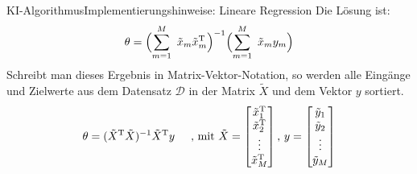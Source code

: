 \documentclass[169, handout	]{THIbeamer} %
\begin{document}
	\begin{frame}{KI-Algorithmus}{Implementierungshinweise: Lineare Regression}
		Die Lösung ist:
		\begin{equation}
				\theta = \Bigl( \sum_{m=1}^M\ \tilde{x}_m \tilde{x}_m^{\text{T}} \Bigr)^{-1} \Bigl( \sum_{m=1}^M\ \tilde{x}_m y_m \Bigr)
		\end{equation}
		Schreibt man dieses Ergebnis in Matrix-Vektor-Notation, so werden alle Eingänge und Zielwerte aus dem Datensatz $\mathcal{D}$ in der Matrix $\tilde{X}$ und dem Vektor $y$ sortiert. 
		\begin{equation}
			\theta = ( \tilde{X}^{\text{T}} \tilde{X} )^{-1} \tilde{X}^{\text{T}} y
			\hspace{0.5 cm}	
			\text{, mit }			
			\tilde{X} = 
			\begin{bmatrix}
				\tilde{x}_1^{\text{T}} \\
				\tilde{x}_2^{\text{T}} \\	
				\vdots \\
				\tilde{x}_M^{\text{T}} \\		
			\end{bmatrix}
			\text{,  }
			y =	
			\begin{bmatrix}
				\tilde{y}_1 \\
				\tilde{y}_2 \\	
				\vdots \\
				\tilde{y}_M \\
			\end{bmatrix}						
		\end{equation}
	\end{frame}
	
\end{document}
